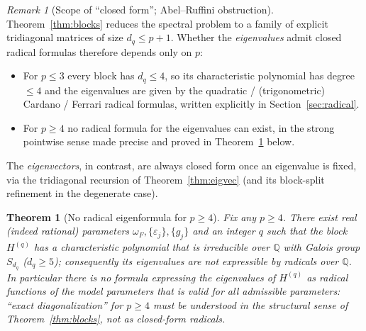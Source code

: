 \documentclass[12pt]{article}
\newtheorem{theorem}{Theorem}
\theoremstyle{definition}
\theoremstyle{remark}
\newtheorem{remark}{Remark}
\begin{document}
\begin{remark}[Scope of ``closed form''; Abel--Ruffini obstruction]\label{rem:closedform}
Theorem~\ref{thm:blocks} reduces the spectral problem to a family of explicit
tridiagonal matrices of size $d_q\le p+1$. Whether the \emph{eigenvalues} admit
closed radical formulas therefore depends only on $p$:
\begin{itemize}
\item For $p\le3$ every block has $d_q\le4$, so its characteristic polynomial has
degree $\le4$ and the eigenvalues are given by the quadratic / (trigonometric)
Cardano / Ferrari radical formulas, written explicitly in
Section~\ref{sec:radical}.
\item For $p\ge4$ no radical formula for the eigenvalues can exist, in the strong
pointwise sense made precise and proved in Theorem~\ref{thm:noradical} below.
\end{itemize}
The \emph{eigenvectors}, in contrast, are always closed form once an eigenvalue is
fixed, via the tridiagonal recursion of Theorem~\ref{thm:eigvec} (and its
block-split refinement in the degenerate case).
\end{remark}

\begin{theorem}[No radical eigenformula for $p\ge4$]\label{thm:noradical}
Fix any $p\ge4$. There exist real (indeed rational) parameters
$\omega_F,\{\varepsilon_j\},\{g_j\}$ and an integer $q$ such that the block
$H^{(q)}$ has a characteristic polynomial that is irreducible over $\mathbb Q$ with
Galois group $S_{d_q}$ ($d_q\ge5$); consequently its eigenvalues are not expressible
by radicals over $\mathbb Q$. In particular there is no formula expressing the
eigenvalues of $H^{(q)}$ as radical functions of the model parameters that is valid
for all admissible parameters: ``exact diagonalization'' for $p\ge4$ must be
understood in the structural sense of Theorem~\ref{thm:blocks}, not as closed-form
radicals.
\end{theorem}
\end{document}
